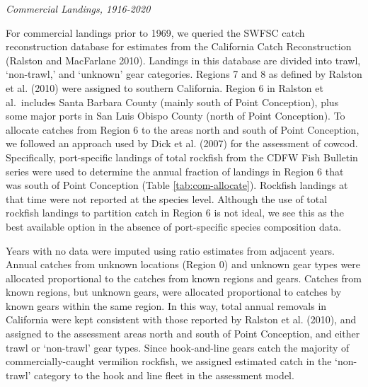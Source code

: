 \documentclass[11pt,
  english,
]{article}
\begin{document}
\emph{Commercial Landings, 1916-2020}

For commercial landings prior to 1969, we queried the SWFSC catch reconstruction database for estimates from the California Catch Reconstruction {(Ralston and MacFarlane 2010)\leavevmode\tagmcend\tagstructend}. Landings in this database are divided into trawl, `non-trawl,' and `unknown' gear categories. Regions 7 and 8 as defined by Ralston et al. {(2010)\leavevmode\tagmcend\tagstructend} were assigned to southern California. Region 6 in Ralston et al.~includes Santa Barbara County (mainly south of Point Conception), plus some major ports in San Luis Obispo County (north of Point Conception). To allocate catches from Region 6 to the areas north and south of Point Conception, we followed an approach used by Dick et al. {(2007)\leavevmode\tagmcend\tagstructend} for the assessment of cowcod. Specifically, port-specific landings of total rockfish from the CDFW Fish Bulletin series were used to determine the annual fraction of landings in Region 6 that was south of Point Conception (Table \ref{tab:com-allocate}). Rockfish landings at that time were not reported at the species level. Although the use of total rockfish landings to partition catch in Region 6 is not ideal, we see this as the best available option in the absence of port-specific species composition data.

Years with no data were imputed using ratio estimates from adjacent years. Annual catches from unknown locations (Region 0) and unknown gear types were allocated proportional to the catches from known regions and gears. Catches from known regions, but unknown gears, were allocated proportional to catches by known gears within the same region. In this way, total annual removals in California were kept consistent with those reported by Ralston et al. {(2010)\leavevmode\tagmcend\tagstructend}, and assigned to the assessment areas north and south of Point Conception, and either trawl or `non-trawl' gear types. Since hook-and-line gears catch the majority of commercially-caught vermilion rockfish, we assigned estimated catch in the `non-trawl' category to the hook and line fleet in the assessment model.
\end{document}
